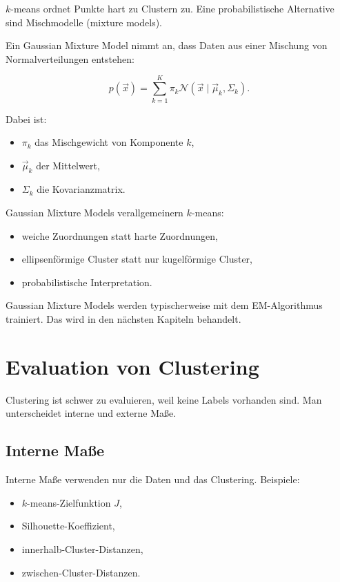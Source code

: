 \(k\)-means ordnet Punkte hart zu Clustern zu.
Eine probabilistische Alternative sind Mischmodelle (mixture models).

Ein Gaussian Mixture Model nimmt an, dass Daten aus einer Mischung von Normalverteilungen entstehen:

\[
    p(\vec{x})
    =
    \sum_{k=1}^{K}
    \pi_k
    \mathcal{N}(\vec{x}\mid\vec{\mu}_k,\Sigma_k).
\]

Dabei ist:

\begin{itemize}
    \item \(\pi_k\) das Mischgewicht von Komponente \(k\),
    \item \(\vec{\mu}_k\) der Mittelwert,
    \item \(\Sigma_k\) die Kovarianzmatrix.
\end{itemize}

\begin{conceptbox}
Gaussian Mixture Models verallgemeinern \(k\)-means:

\begin{itemize}
    \item weiche Zuordnungen statt harte Zuordnungen,
    \item ellipsenförmige Cluster statt nur kugelförmige Cluster,
    \item probabilistische Interpretation.
\end{itemize}
\end{conceptbox}

Gaussian Mixture Models werden typischerweise mit dem EM-Algorithmus trainiert.
Das wird in den nächsten Kapiteln behandelt.

\section{Evaluation von Clustering}

Clustering ist schwer zu evaluieren, weil keine Labels vorhanden sind.
Man unterscheidet interne und externe Maße.

\subsection{Interne Maße}

Interne Maße verwenden nur die Daten und das Clustering.
Beispiele:

\begin{itemize}
    \item \(k\)-means-Zielfunktion \(J\),
    \item Silhouette-Koeffizient,
    \item innerhalb-Cluster-Distanzen,
    \item zwischen-Cluster-Distanzen.
\end{itemize}

